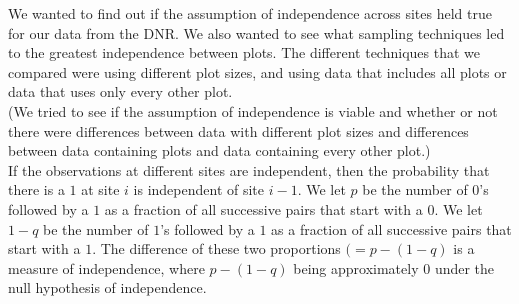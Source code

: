 \documentclass{article}
\begin{document}
		We wanted to find out if the assumption of independence across sites held
true for our data from the DNR.  We also wanted to see what sampling techniques 
led to the greatest independence between plots.  The different techniques that we
compared were using different plot sizes, and using data that includes all plots
or data that uses only every other plot. \\
		(We tried to see if the assumption of independence is viable and whether or
			not there were differences between data with different plot sizes and 
			differences between data containing plots and data containing every 
			other plot.) \\
		If the observations at different sites are independent, then the 
probability that there is a \(1\) at site \(i\)  is independent of site \(i-1\).  
We let \(p\) be the number of \(0\)'s followed by a \(1\) as a fraction of all 
successive pairs that start with a \(0\).  We let \(1-q\) be the number of \(1\)'s
followed by a \(1\) as a fraction of all successive pairs that start with a \(1\).
The difference of these two proportions \((=p-(1-q)\) is a measure of independence,
where \(p-(1-q)\) being approximately \(0\) under the null hypothesis of 
independence.  
\end{document}
